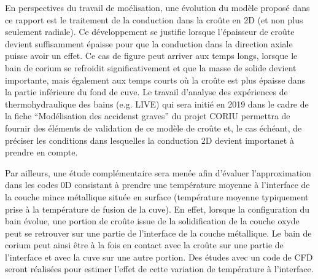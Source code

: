 En perspectives du travail de moélisation, une évolution du modèle proposé dans ce rapport est le traitement de la conduction dans la croûte en 2D (et non plus seulement radiale). Ce développement se justifie lorsque l'épaisseur de croûte devient suffisamment épaisse pour que la conduction dans la direction axiale puisse avoir un effet. Ce cas de figure peut arriver aux temps longs, lorsque le bain de corium se refroidit significativement et que la masse de solide devient importante, mais également aux temps courts où la croûte est plus épaisse dans la partie inférieure du fond de cuve. Le travail d'analyse des expériences de thermohydraulique des bains (e.g. LIVE) qui sera initié en 2019 dans le cadre de la fiche ``Modélisation des accidenst graves'' du projet CORIU permettra de fournir des éléments de validation de ce modèle de croûte et, le cas échéant, de préciser les conditions dans lesquelles la conduction 2D devient importanet à prendre en compte.

Par ailleurs, une étude complémentaire sera menée afin d'évaluer l'approximation dans les codes 0D consistant à prendre une température moyenne à l'interface de la couche mince métallique située en surface (température moyenne typiquement prise à la température de fusion de la cuve). En effet, lorsque la configuration du bain évolue, une portion de croûte issue de la solidification de la couche oxyde peut se retrouver sur une partie de l'interface de la couche métallique. Le bain de corium peut ainsi être à la fois en contact avec la croûte sur une partie de l'interface et avec la cuve sur une autre portion. Des études avec un code de CFD seront réalisées pour estimer l'effet de cette variation de température à l'interface.
